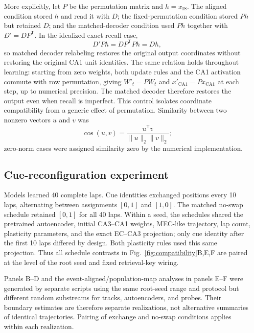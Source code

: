 More explicitly, let $P$ be the permutation matrix and $h=x_{\mathrm{IS}}$.
The aligned condition stored $h$ and read it with $D$; the fixed-permutation
condition stored $Ph$ but retained $D$; and the matched-decoder condition used
$Ph$ together with $D'=DP^{\mathsf T}$. In the idealized exact-recall case,
\begin{equation}
D'Ph=DP^{\mathsf T}Ph=Dh,
\end{equation}
so matched decoder relabeling restores the original output coordinates without
restoring the original CA1 unit identities. The same relation holds throughout
learning: starting from zero weights, both update rules and the CA1 activation
commute with row permutation, giving $W'_t=PW_t$ and
$x'_{\mathrm{CA1}}=Px_{\mathrm{CA1}}$ at each step, up to numerical precision.
The matched decoder therefore restores the output even when recall is
imperfect. This control isolates coordinate
compatibility from a generic effect of permutation. Similarity between two
nonzero vectors $u$ and $v$ was
\begin{equation}
\operatorname{cos}(u,v)=\frac{u^{\mathsf T}v}
 {\lVert u\rVert_2\lVert v\rVert_2};
\end{equation}
zero-norm cases were assigned similarity zero by the numerical implementation.

\subsection{Cue-reconfiguration experiment}

Models learned 40 complete laps. Cue identities exchanged positions every 10
laps, alternating between assignments $[0,1]$ and $[1,0]$. The matched
no-swap schedule retained $[0,1]$ for all 40 laps. Within a seed, the schedules
shared the pretrained autoencoder, initial CA3--CA1 weights, MEC-like
trajectory, lap count, plasticity parameters, and the exact EC--CA3 projection;
only cue identity after the first 10 laps differed by design. Both plasticity
rules used this same projection. Thus all schedule contrasts in
Fig.~\ref{fig:compatibility}B,E,F are paired at the level of the root seed and
fixed retrieval-key wiring.

Panels B--D and the event-aligned/population-map analyses in panels E--F
were generated by separate scripts using the same root-seed range and protocol
but different random substreams for tracks, autoencoders, and probes. Their
boundary estimates are therefore separate realizations, not alternative
summaries of identical trajectories. Pairing of exchange and no-swap
conditions applies within each realization.

